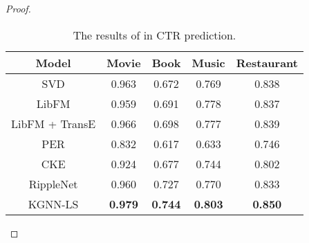 \documentclass[sigconf]{acmart}
\begin{document}
\begin{proof}
			\begin{table}[t]
    			\centering
    			\setlength{\tabcolsep}{6pt}
    			\begin{tabular}{c|cccc}
    				\hline
    				Model & Movie & Book & Music & Restaurant \\
            		\hline
            		SVD & 0.963 & 0.672 & 0.769 & 0.838 \\
            		LibFM & 0.959 & 0.691 & 0.778 & 0.837 \\
            		LibFM + TransE & 0.966 & 0.698 & 0.777 & 0.839 \\
            		PER & 0.832 & 0.617 & 0.633 & 0.746 \\
            		CKE & 0.924 & 0.677 & 0.744 & 0.802 \\
            		RippleNet & 0.960 & 0.727 & 0.770 & 0.833 \\
            		\hline
            		KGNN-LS & \textbf{0.979} & \textbf{0.744} & \textbf{0.803} & \textbf{0.850} \\
            		\hline
				\end{tabular}
				\vspace{0.05in}
				\caption{The results of  in CTR prediction.}
				\label{table:ctr}
				\vspace{-0.2in}
			\end{table}
		

\end{proof}
\end{document}
